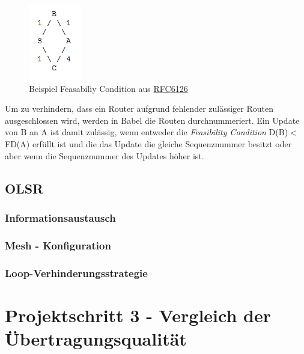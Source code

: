 \documentclass[10pt]{scrartcl}
\begin{document}
\begin{figure}[htbp]
	\centering	\includegraphics{Grafiken/Feasibility.png}
	\caption{Beispiel Feasabiliy Condition aus \href{http://tools.ietf.org/html/rfc6126}{RFC6126}}
	\label{fig:Feasibility}
\end{figure} 

Um zu verhindern, dass ein Router aufgrund fehlender zulässiger Routen ausgeschlossen wird, werden in Babel die Routen durchnummeriert. Ein Update von B an A ist damit zulässig, wenn entweder die \textit{Feasibility Condition} D(B)$<$FD(A) erfüllt ist und die das Update die gleiche Sequenznummer besitzt oder aber wenn die Sequenznummer des Updates höher ist.


\subsection{OLSR}
\subsubsection{Informationsaustausch}
\subsubsection{Mesh - Konfiguration}
\subsubsection{Loop-Verhinderungsstrategie}

\section{Projektschritt 3 - Vergleich der Übertragungsqualität}
\end{document}
